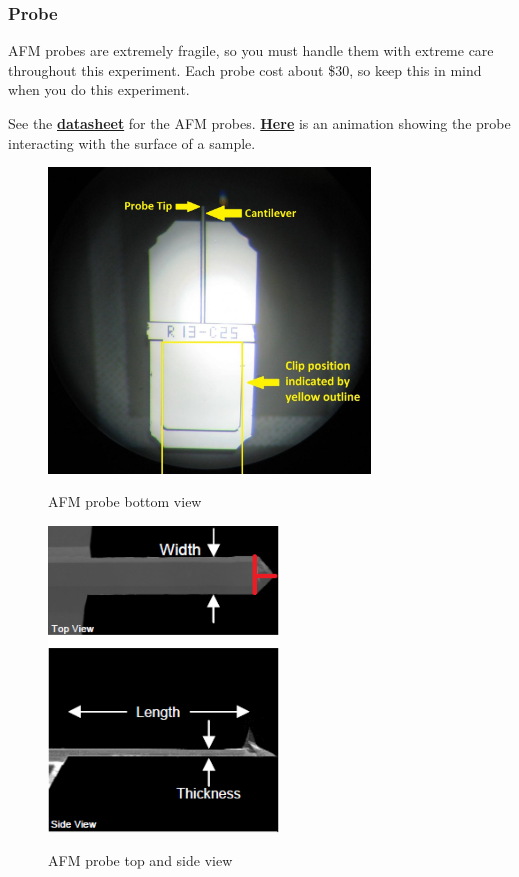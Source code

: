 \documentclass{../lab}
\begin{document}
\subsubsection{Probe}

AFM probes are extremely fragile, so you must handle them with extreme care throughout this experiment. Each probe cost about \$30, so keep this in mind when you do this experiment.

See the \href{http://experimentationlab.berkeley.edu/sites/default/files/AFMImages/ACLA\_4\_datasheet.pdf}{\textbf{datasheet}} for the AFM probes. \href{http://experimentationlab.berkeley.edu/sites/default/files/AFMImages/1.1.\%20Generating\%20an\%20image.flv\_converted.mp4}{\textbf{Here}} is an animation showing the probe interacting with the surface of a sample.

\begin{figure}[H]
\centering
  \href{http://experimentationlab.berkeley.edu/sites/default/files/AFMImages/AFMprobe.JPG}{\includegraphics[height=230pt,keepaspectratio]{images/AFMprobe.JPG}}
  \caption{AFM probe bottom view}
  \label{fig:AFMProbe}
\endminipage\hfill
{}
\centering
  \href{http://experimentationlab.berkeley.edu/sites/default/files/AFMImages/26.png}{\includegraphics[height=230pt,keepaspectratio]{images/26.png}}
  \caption{AFM probe top and side view}
  \label{fig:AFMProbe2}
\endminipage
\end{figure}
\end{document}
